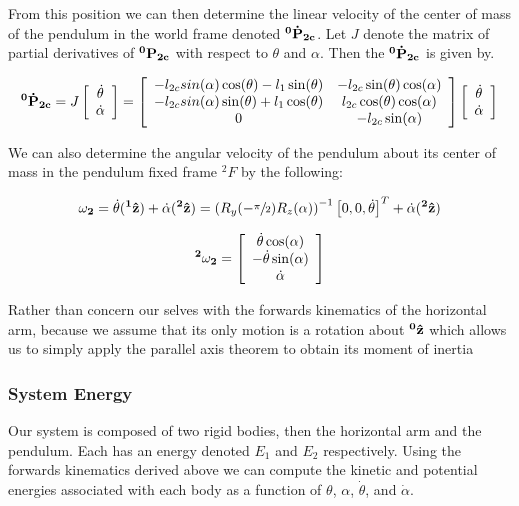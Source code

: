 \documentclass{article}
\theoremstyle{plain}
\theoremstyle{definition}
\theoremstyle{remark}
\begin{document}
From this position we can then determine the linear velocity of the center of mass of the pendulum in the world frame denoted $\bf{^0\dot{P}_{2c}}$.  Let $J$ denote the matrix of partial derivatives of $\bf{^0P_{2c}}$ with respect to $\theta$ and $\alpha$.  Then the $\bf{^0\dot{P}_{2c}}$ is given by.

$$ {\bf{^0\dot{P}_{2c}}} = J \left[ \begin{array}{c l} \dot{\theta} \\ \dot{\alpha} \end{array} \right] = \left[ \begin{array}{c c l} 
	-l_{2c} sin(\alpha) \cos(\theta) - l_{1} \sin(\theta)  &  -l_{2c} \sin(\theta) \cos(\alpha) \\
	-l_{2c} sin(\alpha) \sin(\theta) + l_1 \cos(\theta) & l_{2c} \cos(\theta) \cos(\alpha) \\
	0 & -l_{2c} \sin(\alpha) \\ \end{array} \right] \left[ \begin{array}{c l} \dot{\theta} \\ \dot{\alpha} \end{array} \right]$$

We can also determine the angular velocity of the pendulum about its center of mass in the pendulum fixed frame $^2F$  by the following:

$$ {\bf{\omega_{2}}}= \dot{\theta} ({\bf{^1\hat{z}}}) + \dot{\alpha}({\bf{^2\hat{z}}})  = \left( R_{y}(-\sfrac{\pi}{2}) R_{z}(\alpha)\right)^{-1} \left[ 0, 0, \dot{\theta} \right]^T + \dot{\alpha}({\bf{^2\hat{z}}})$$

$$  {\bf{^2\omega_{2}}}= \left[ \begin{array}{c l}   \dot{\theta} \cos(\alpha) \\ -\dot{\theta} \sin(\alpha) \\ \dot{\alpha} \end{array} \right]$$

Rather than concern our selves with the forwards kinematics of the horizontal arm, because we assume that its only motion is a rotation about $\bf{^0\hat{z}}$ which allows us to simply apply the parallel axis theorem to obtain its moment of inertia 


\subsubsection*{System Energy}

Our system is composed of two rigid bodies, then the horizontal arm and the pendulum.  Each has an energy denoted $E_1$ and $E_2$ respectively.  Using the forwards kinematics derived above we can compute the kinetic and potential energies associated with each body as a function of $\theta$, $\alpha$, $\dot{\theta}$, and $\dot{\alpha}$.
\end{document}
